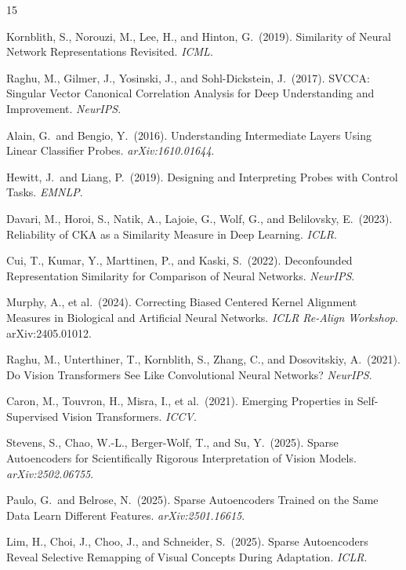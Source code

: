 \documentclass{article}
\begin{document}
\begin{thebibliography}{15}

Kornblith, S., Norouzi, M., Lee, H., and Hinton, G.\ (2019).
Similarity of Neural Network Representations Revisited.
\textit{ICML}.

Raghu, M., Gilmer, J., Yosinski, J., and Sohl-Dickstein, J.\ (2017).
SVCCA: Singular Vector Canonical Correlation Analysis for Deep Understanding and Improvement.
\textit{NeurIPS}.

Alain, G.\ and Bengio, Y.\ (2016).
Understanding Intermediate Layers Using Linear Classifier Probes.
\textit{arXiv:1610.01644}.

Hewitt, J.\ and Liang, P.\ (2019).
Designing and Interpreting Probes with Control Tasks.
\textit{EMNLP}.

Davari, M., Horoi, S., Natik, A., Lajoie, G., Wolf, G., and Belilovsky, E.\ (2023).
Reliability of CKA as a Similarity Measure in Deep Learning.
\textit{ICLR}.

Cui, T., Kumar, Y., Marttinen, P., and Kaski, S.\ (2022).
Deconfounded Representation Similarity for Comparison of Neural Networks.
\textit{NeurIPS}.

Murphy, A., et al.\ (2024).
Correcting Biased Centered Kernel Alignment Measures in Biological and Artificial Neural Networks.
\textit{ICLR Re-Align Workshop}. arXiv:2405.01012.

Raghu, M., Unterthiner, T., Kornblith, S., Zhang, C., and Dosovitskiy, A.\ (2021).
Do Vision Transformers See Like Convolutional Neural Networks?
\textit{NeurIPS}.

Caron, M., Touvron, H., Misra, I., et al.\ (2021).
Emerging Properties in Self-Supervised Vision Transformers.
\textit{ICCV}.

Stevens, S., Chao, W.-L., Berger-Wolf, T., and Su, Y.\ (2025).
Sparse Autoencoders for Scientifically Rigorous Interpretation of Vision Models.
\textit{arXiv:2502.06755}.

Paulo, G.\ and Belrose, N.\ (2025).
Sparse Autoencoders Trained on the Same Data Learn Different Features.
\textit{arXiv:2501.16615}.

Lim, H., Choi, J., Choo, J., and Schneider, S.\ (2025).
Sparse Autoencoders Reveal Selective Remapping of Visual Concepts During Adaptation.
\textit{ICLR}.


\end{thebibliography}
\end{document}
